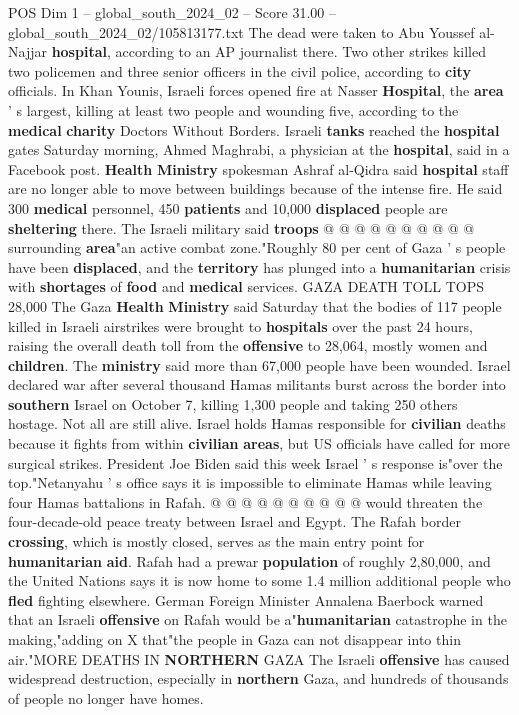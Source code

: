 \begin{textsample}{POS Dim 1 – global\_south\_2024\_02 – Score 31.00 – global\_south\_2024\_02/105813177.txt}
The dead were taken to Abu Youssef al-Najjar \textbf{hospital}, according to an AP journalist there.
Two other strikes killed two policemen and three senior officers in the civil police, according to \textbf{city} officials.
In Khan Younis, Israeli forces opened fire at Nasser \textbf{Hospital}, the \textbf{area} ' s largest, killing at least two people and wounding five, according to the \textbf{medical} \textbf{charity} Doctors Without Borders.
Israeli \textbf{tanks} reached the \textbf{hospital} gates Saturday morning, Ahmed Maghrabi, a physician at the \textbf{hospital}, said in a Facebook post. \textbf{Health} \textbf{Ministry} spokesman Ashraf al-Qidra said \textbf{hospital} staff are no longer able to move between buildings because of the intense fire.
He said 300 \textbf{medical} personnel, 450 \textbf{patients} and 10,000 \textbf{displaced} people are \textbf{sheltering} there.
The Israeli military said \textbf{troops} @ @ @ @ @ @ @ @ @ @ surrounding \textbf{area}"an active combat zone."Roughly 80 per cent of Gaza ' s people have been \textbf{displaced}, and the \textbf{territory} has plunged into a \textbf{humanitarian} crisis with \textbf{shortages} of \textbf{food} and \textbf{medical} services.
GAZA DEATH TOLL TOPS 28,000 The Gaza \textbf{Health} \textbf{Ministry} said Saturday that the bodies of 117 people killed in Israeli airstrikes were brought to \textbf{hospitals} over the past 24 hours, raising the overall death toll from the \textbf{offensive} to 28,064, mostly women and \textbf{children}.
The \textbf{ministry} said more than 67,000 people have been wounded.
Israel declared war after several thousand Hamas militants burst across the border into \textbf{southern} Israel on October 7, killing 1,300 people and taking 250 others hostage.
Not all are still alive.
Israel holds Hamas responsible for \textbf{civilian} deaths because it fights from within \textbf{civilian} \textbf{areas}, but US officials have called for more surgical strikes.
President Joe Biden said this week Israel ' s response is"over the top."Netanyahu ' s office says it is impossible to eliminate Hamas while leaving four Hamas battalions in Rafah. @ @ @ @ @ @ @ @ @ @ would threaten the four-decade-old peace treaty between Israel and Egypt.
The Rafah border \textbf{crossing}, which is mostly closed, serves as the main entry point for \textbf{humanitarian} \textbf{aid}.
Rafah had a prewar \textbf{population} of roughly 2,80,000, and the United Nations says it is now home to some 1.4 million additional people who \textbf{fled} fighting elsewhere.
German Foreign Minister Annalena Baerbock warned that an Israeli \textbf{offensive} on Rafah would be a"\textbf{humanitarian} catastrophe in the making,"adding on X that"the people in Gaza can not disappear into thin air."MORE DEATHS IN \textbf{NORTHERN} GAZA The Israeli \textbf{offensive} has caused widespread destruction, especially in \textbf{northern} Gaza, and hundreds of thousands of people no longer have homes.

\end{textsample}
